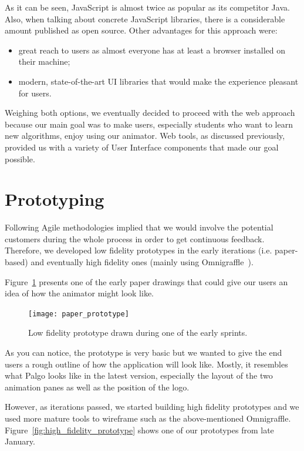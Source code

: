 \documentclass{l4proj}
\begin{document}
As it can be seen, JavaScript is almost twice as popular as its competitor Java. Also, when talking about concrete JavaScript libraries, there is a considerable amount published as open source. Other advantages for this approach were:

\begin{itemize}
    \item great reach to users as almost everyone has at least a browser installed on their machine;
    \item modern, state-of-the-art UI libraries that would make the experience pleasant for users.
\end{itemize}

Weighing both options, we eventually decided to proceed with the web approach because our main goal was to make users, especially students who want to learn new algorithms, enjoy using our animator. Web tools, as discussed previously, provided us with a variety of User Interface components that made our goal possible.

\section{Prototyping}

Following Agile methodologies implied that we would involve the potential customers during the whole process in order
to get continuous feedback. Therefore, we developed low fidelity prototypes in the early iterations (i.e.
paper-based) and eventually high fidelity ones (mainly using Omnigraffle~\cite{omnigraffle}).

Figure~\ref{fig:paper_prototype} presents one of the early paper drawings that could give our users an idea of how the animator might look
like.

\begin{figure}[!ht]
    \centering
    \texttt{[image: paper\_prototype]}
    \caption{Low fidelity prototype drawn during one of the early sprints.}
    \label{fig:paper_prototype}
\end{figure}

As you can notice, the prototype is very basic but we wanted to give the end users a rough outline of how the application will
look like. Mostly, it resembles what Palgo looks like in the latest version, especially the layout of the two animation
panes as well as the position of the logo.

However, as iterations passed, we started building high fidelity prototypes and we used more mature tools to wireframe
such as the above-mentioned Omnigraffle. Figure~\ref{fig:high_fidelity_prototype} shows one of our prototypes from
late January.
\end{document}
